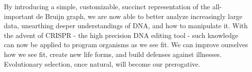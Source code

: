 By introducing a simple, customizable, succinct representation of the all-important de Bruijn graph, we are now able to better analyze increasingly large data, unearthing deeper understandings of DNA, and how to manipulate it. With the advent of CRISPR - the high precision DNA editing tool - such knowledge can now be applied to program organisms as we see fit. We can improve ourselves how we see fit, create new life forms, and build defenses against illnesses. Evolutionary selection, once natural, will become our prerogative.



